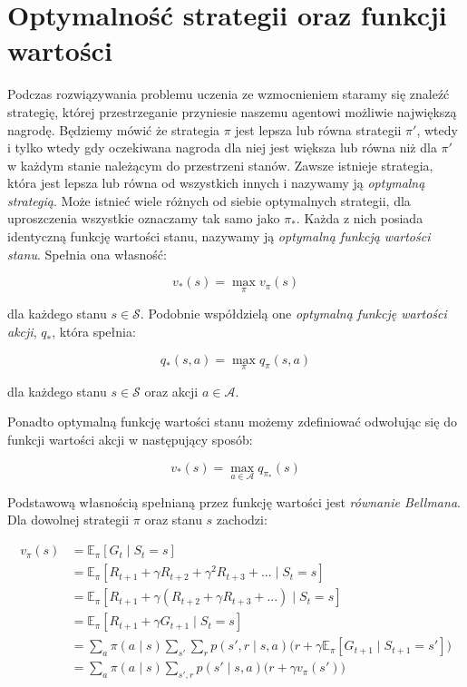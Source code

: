 \documentclass[licencjacka]{pracamgr}
\begin{document}
\section{Optymalność strategii oraz funkcji wartości}

Podczas rozwiązywania problemu uczenia ze wzmocnieniem staramy się znaleźć strategię, której przestrzeganie przyniesie naszemu agentowi możliwie największą nagrodę. Będziemy mówić że strategia $\pi$ jest lepsza lub równa strategii $\pi'$, wtedy i tylko wtedy gdy oczekiwana nagroda dla niej jest większa lub równa niż dla $\pi'$ w każdym stanie należącym do przestrzeni stanów. Zawsze istnieje strategia, która jest lepsza lub równa od wszystkich innych i nazywamy ją \emph{optymalną strategią}. Może istnieć wiele różnych od siebie optymalnych strategii, dla uproszczenia wszystkie oznaczamy tak samo jako $\pi_{\ast}$. Każda z nich posiada identyczną funkcję wartości stanu, nazywamy ją \emph{optymalną funkcją wartości stanu}. Spełnia ona własność:

$$ v_{\ast}(s) = \max_{\pi} v_{\pi}(s) $$

dla każdego stanu $s \in \mathcal{S}$. Podobnie współdzielą one \emph{optymalną funkcję wartości akcji}, $q_{\ast}$, która spełnia:

$$ q_{\ast}(s, a) = \max_{\pi} q_{\pi}(s, a) $$

dla każdego stanu $s \in \mathcal{S}$ oraz akcji $a \in \mathcal{A}$.

Ponadto optymalną funkcję wartości stanu możemy zdefiniować odwołując się do funkcji wartości akcji w następujący sposób:

$$ v_{\ast}(s) = \max_{a \in \mathcal{A}} q_{\pi_{\ast}}(s) $$

Podstawową własnością spełnianą przez funkcję wartości jest \emph{równanie Bellmana}. Dla dowolnej strategii $\pi$ oraz stanu $s$ zachodzi:

\begin{align}
v_{\pi}(s) &= \mathbb{E}_{\pi}[G_t \mid S_t = s]  \nonumber \\
&= \mathbb{E}_{\pi}[R_{t+1} + \gamma R_{t+2} + \gamma^2 R_{t+3} + ... \mid S_t = s]  \nonumber \\
&= \mathbb{E}_{\pi}[R_{t+1} + \gamma (R_{t+2} + \gamma R_{t+3} + ... ) \mid S_t = s]  \nonumber \\
&= \mathbb{E}_{\pi}[R_{t+1} + \gamma G_{t+1} \mid S_t = s] \nonumber \\
&= \sum_a \pi(a \mid s) \sum_{s'} \sum_r p(s', r \mid s, a) \Big(r + \gamma \mathbb{E}_{\pi}[G_{t+1} \mid S_{t+1} = s' ]\Big) \nonumber \\
&= \sum_a \pi(a \mid s) \sum_{s', r} p(s'\mid s, a) \Big(r + \gamma v_{\pi}(s') \Big)
\end{align}
\end{document}
